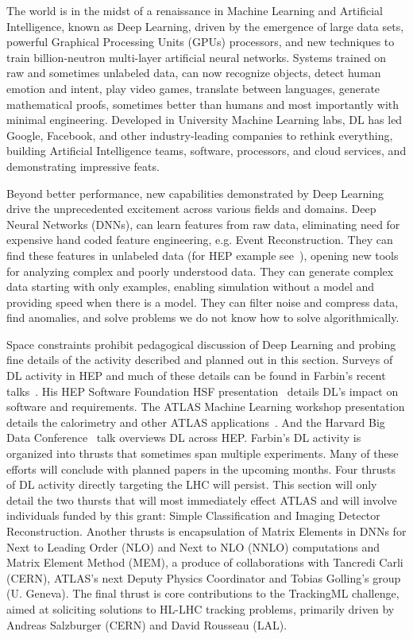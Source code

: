 \label{sec:af_deeplearning}

The world is in the midst of a renaissance in Machine Learning and
Artificial Intelligence, known as Deep Learning, driven by the
emergence of large data sets, powerful Graphical Processing Units
(GPUs) processors, and new techniques to train billion-neutron
multi-layer artificial neural networks. Systems trained on raw and
sometimes unlabeled data, can now recognize objects, detect human
emotion and intent, play video games, translate between languages,
generate mathematical proofs, sometimes better than humans and most
importantly with minimal engineering. Developed in University Machine
Learning labs, DL has led Google, Facebook, and other industry-leading
companies to rethink everything, building Artificial Intelligence
teams, software, processors, and cloud services, and demonstrating
impressive feats.

Beyond better performance, new capabilities demonstrated by Deep
Learning drive the unprecedented excitement across various fields and
domains. Deep Neural Networks (DNNs), can learn features from raw
data, eliminating need for expensive hand coded feature engineering,
e.g. Event Reconstruction. They can find these features in unlabeled
data (for HEP example see~\cite{}), opening new tools for analyzing
complex and poorly understood data. They can generate complex data
starting with only examples, enabling simulation without a model and
providing speed when there is a model. They can filter noise and
compress data, find anomalies, and solve problems we do not know how
to solve algorithmically.

Space constraints prohibit pedagogical discussion of Deep Learning and
probing fine details of the activity described and planned out in this
section. Surveys of DL activity in HEP and much of these details can
be found in Farbin's recent talks~\cite{}. His HEP Software Foundation
HSF presentation~\cite{} details DL's impact on software and
requirements. The ATLAS Machine Learning workshop presentation details
the calorimetry and other ATLAS applications~\cite{}. And the Harvard
Big Data Conference~\cite{} talk overviews DL across HEP. Farbin's DL
activity is organized into thrusts that sometimes span multiple
experiments. Many of these efforts will conclude with planned papers
in the upcoming months. Four thrusts of DL activity directly targeting
the LHC will persist.  This section will only detail the two thursts
that will most immediately effect ATLAS and will involve individuals
funded by this grant: Simple Classification and Imaging Detector
Reconstruction. Another thrusts is encapsulation of Matrix Elements in
DNNs for Next to Leading Order (NLO) and Next to NLO (NNLO)
computations and Matrix Element Method (MEM), a produce of
collaborations with Tancredi Carli (CERN), ATLAS's next Deputy Physics
Coordinator and Tobias Golling's group (U. Geneva). The final thrust
is core contributions to the TrackingML challenge, aimed at soliciting
solutions to HL-LHC tracking problems, primarily driven by Andreas
Salzburger (CERN) and David Rousseau (LAL).

